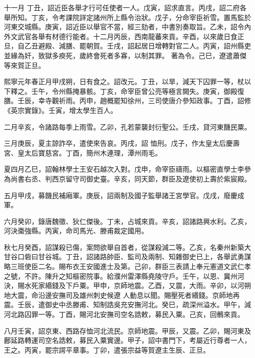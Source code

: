 \begin{pinyinscope}
 十一月
 丁丑，詔近臣各舉才行可任使者一人。戊寅，詔求直言。丙戌，詔二府各舉所知。丁亥，令考課院詳定諸州所上縣令治狀。戊子，分命宰臣祈雪。置馬監於河東交城縣。庚寅，詔近臣以舉官不當，經三劾者，中書別奏取旨。乙未，詔令內外文武官各舉有材德行能者。十二月丙辰，西南龍蕃來貢。辛酉，以來歲日食正旦，自乙丑避殿、減膳、罷朝賀。壬戌，詔起居日增轉對官二人。丙寅，詔州縣吏並緣為奸，致獄多瘐死，歲終會死者多寡，以制其罪。
 著為令。己巳，遼遣蕭傑等來賀正旦。



 熙寧元年春正月甲戌朔，日有食之。詔改元。丁丑，以旱，減天下囚罪一等，杖以下釋之。壬午，令州縣掩暴骸。丁亥，命宰臣曾公亮等極言闕失。庚寅，御殿復膳。壬辰，幸寺觀祈雨。丙申，趙概罷知徐州，三司使唐介參知政事。丁酉，詔修《英宗實錄》。壬寅，增太學生百人。



 二月辛亥，令諸路每季上雨雪。乙卯，孔若蒙襲封衍聖公。壬戌，貸河東饑民粟。



 三月庚辰，夏主諒詐卒，遣使來告哀。丙戌，詔
 恤刑。戊子，作太皇太后慶壽宮、皇太后寶慈宮。丁酉，簡州木連理，潭州雨毛。



 夏四月乙巳，詔翰林學士王安石越次入對。戊申，命宰臣禱雨。以樞密直學士李參為尚書右丞、判西京留守司御史臺。辛亥，同天節，群臣及遼使初上壽於紫宸殿。



 五月甲戌，募饑民補廂軍。庚辰，詔兩制及國子監舉諸王宮學官。戊戌，廢慶成軍。



 六月癸卯，錄唐魏徵、狄仁傑後。丁未，占城來貢。辛亥，詔諸路興水利。乙亥，河決棗強縣。丙寅，命司馬光、滕甫裁定國用。



 秋七月癸酉，詔謀殺已傷，案問欲舉自首者，從謀殺減二等。乙亥，名秦州新築大甘谷口砦曰甘谷城。丁丑，詔諸路帥臣、監司及兩制、知雜御史已上，各舉武勇謀略三班使臣二名。賜布衣王安國進士及第。己卯，群臣三表請上奉元憲道文武仁孝之號，不許。陳升之知樞密院事。給濮州雷澤縣堯陵守戶。壬午，以恩、冀州河決，賜水死家緡錢及下戶粟。甲申，京師地震。乙酉，又震，大雨。辛卯，以河朔地大震，命沿邊安撫司及雄州刺史候遼
 人動息以聞。賜壓死者緡錢。京師地再震。壬辰，遣御史中丞滕甫、知制誥吳充安撫河北。癸巳，疏深州溢水。甲午，減河北路囚罪一等。丁酉，賜河北安撫司空名誥敕，募民入粟。己亥，回鶻來貢。



 八月壬寅，詔京東、西路存恤河北流民。京師地震。甲辰，又震。乙卯，賜河東及鄜延路轉運司空名誥敕，募民入粟實邊。甲子，詔中書門下，考屬近行尊者一人，王之。丙寅，罷宗諤平章事。丁卯，遣張宗益等賀遼主生辰、正旦。




\end{pinyinscope}

